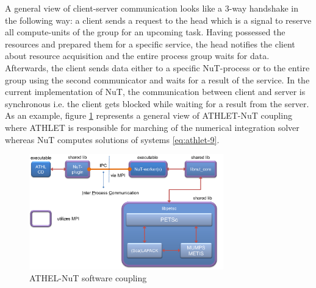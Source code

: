 A general view of client-server communication looks like a 3-way handshake in the following way: a client sends a request to the head which is a signal to reserve all compute-units of the group for an upcoming task. Having possessed the resources and prepared them for a specific service, the head notifies the client about resource acquisition and the entire process group waits for data. Afterwards, the client sends data either to a specific NuT-process or to the entire group using the second communicator and waits for a result of the service. In the current implementation of NuT, the communication between client and server is synchronous i.e. the client gets blocked while waiting for a result from the server. \\


As an example, figure \ref{fig:introduction-athlet-nut-coupling} represents a general view of ATHLET-NuT coupling where ATHLET is responsible for marching of the numerical integration solver whereas NuT computes solutions of systems \ref{eq:athlet-9}.\\


\figpointer{\ref{fig:introduction-athlet-nut-coupling}}
\begin{figure}
  \centering
  \includegraphics[width=0.75\textwidth]{figures/introduction-athlet-nut-coupling.png}
\caption{ATHEL-NuT software coupling}
\label{fig:introduction-athlet-nut-coupling}
\end{figure}



